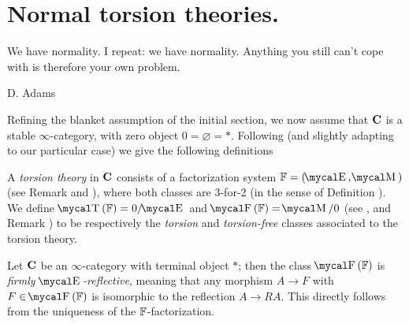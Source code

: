 \section{Normal torsion theories.}
\setlength{\epigraphwidth}{.75\textwidth}
\epigraph{We have normality. I repeat: we have normality. Anything you still can't cope with is therefore your own problem.}{D\@. Adams}
\setlength{\epigraphwidth}{\DefaultEpigraphWidth}
Refining the blanket assumption of the initial section, we now assume that $\textbf{C}$ is a stable $\infty$\hyp{}category, with zero object $0=\varnothing=*$. Following (and slightly adapting to our particular case) \cite[\S\textbf{4}]{RT} we give the following definitions
\begin{definition}\label{tortorfree}
A \emph{torsion theory} in $\textbf{C}$ consists of a factorization system $\fF=(\EE,\MM)$ (see Remark  and \adef {}), where both classes are 3\hyp{}for\hyp{}2 (in the sense of Definition ). We define
 $\TT(\fF) = 0/\EE$ and $\F(\fF) =  \MM/0$ (see \aprop {}, and Remark ) to be respectively the \emph{torsion} and \emph{torsion\hyp{}free} classes associated to the torsion theory.
\end{definition}
\begin{remark}
\cite[\textbf{3.1}]{RT}
\label{firm.reflective}
Let $\textbf{C}$ be an $\infty$\hyp{}category with terminal object $*$; then the class $\F(\fF)$ is \emph{firmly $\EE$\hyp{}reflective}, meaning that any morphism $A\to F$ with $F\in \F(\fF)$ is isomorphic to the reflection $A\to RA$. 
This directly follows from the uniqueness of the $\mathbb{F}$\hyp{}factorization.
\end{remark}
